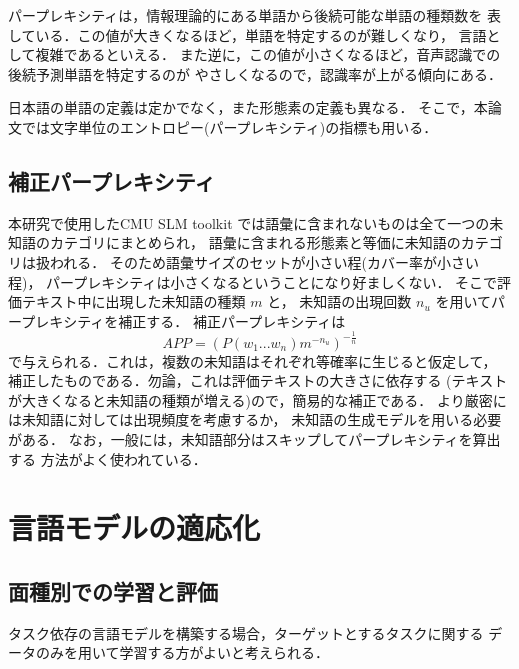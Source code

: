 パープレキシティは，情報理論的にある単語から後続可能な単語の種類数を
表している．この値が大きくなるほど，単語を特定するのが難しくなり，
言語として複雑であるといえる．
また逆に，この値が小さくなるほど，音声認識での後続予測単語を特定するのが
やさしくなるので，認識率が上がる傾向にある\cite{test13}．

日本語の単語の定義は定かでなく，また形態素の定義も異なる．
そこで，本論文では文字単位のエントロピー(パープレキシティ)の指標も用いる．

\vspace*{-1mm}
\subsection{補正パープレキシティ}

本研究で使用したCMU SLM toolkit\cite{test14}
では語彙に含まれないものは全て一つの未知語のカテゴリにまとめられ，
語彙に含まれる形態素と等価に未知語のカテゴリは扱われる．
そのため語彙サイズのセットが小さい程(カバー率が小さい程)，
パープレキシティは小さくなるということになり好ましくない．
そこで評価テキスト中に出現した未知語の種類 $m$ と，
未知語の出現回数 $n_u$ を用いてパープレキシティを補正する\cite{test15}．
補正パープレキシティは
\vspace*{-3mm}
\begin{equation}
 APP = (P(w_1...w_n)m^{-n_u})^{-\frac{1}{n}}
\end{equation}
で与えられる．これは，複数の未知語はそれぞれ等確率に生じると仮定して，
補正したものである．勿論，これは評価テキストの大きさに依存する
(テキストが大きくなると未知語の種類が増える)ので，簡易的な補正である．
より厳密には未知語に対しては出現頻度を考慮するか\cite{newapp}，
未知語の生成モデルを用いる必要がある\cite{test5}．
なお，一般には，未知語部分はスキップしてパープレキシティを算出する
方法がよく使われている．

\vspace*{-1mm}
\section{言語モデルの適応化}
\vspace*{-1mm}
\subsection{面種別での学習と評価}
\vspace*{-1mm}
 タスク依存の言語モデルを構築する場合，ターゲットとするタスクに関する
 データのみを用いて学習する方がよいと考えられる\cite{test16}．

